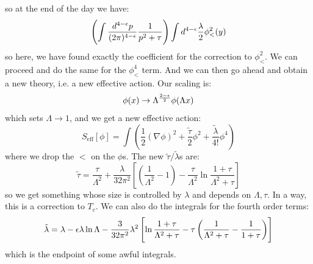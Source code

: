 so at the end of the day we have:
\begin{equation}
    \left(\int \frac{d^{4-\e}p}{(2\pi)^{4-\e}}\frac{1}{p^2 + \tau}\right)\int d^{4-\e}\frac{\lambda}{2}\phi_<^2(y)
\end{equation}
so here, we have found exactly the coefficient for the correction to  $\phi_<^2$. We can proceed and do the same for the $\phi_<^4$ term. And we can then go ahead and obtain a new theory, i.e. a new effective action. Our scaling is:
\begin{equation}
    \phi(x) \to \Lambda^{\frac{2 - \e}{2}}\phi(\Lambda x)
\end{equation}
which sets $\Lambda \to 1$, and we get a new effective action:
\begin{equation}
    S_{\text{eff}}[\phi] = \int\left(\frac{1}{2}(\nabla \phi)^2 + \frac{\tilde{\tau}}{2}\phi^2 + \frac{\tilde{\lambda}}{4!}\phi^4\right)
\end{equation}
where we drop the $<$ on the $\phi$s. The new $\tilde{\tau}/\tilde{\lambda}$s are:
\begin{equation}
    \tilde{\tau} = \frac{\tau}{\Lambda^2} + \frac{\lambda}{32\pi^2}\left[\left(\frac{1}{\Lambda^2} - 1\right) - \frac{\tau}{\Lambda^2}\ln\frac{1 + \tau}{\Lambda^2 + \tau}\right]
\end{equation}
so we get something whose size is controlled by $\lambda$ and depends on $\Lambda, \tau$. In a way, this is a correction to $T_c$. We can also do the integrals for the fourth order terms:
\begin{equation}
    \tilde{\lambda} = \lambda - \epsilon\lambda \ln\Lambda - \frac{3}{32\pi^2}\lambda^2\left[\ln\frac{1+\tau}{\Lambda^2 + \tau} - \tau\left(\frac{1}{\Lambda^2 + \tau} - \frac{1}{1 + \tau}\right)\right]
\end{equation}
which is the endpoint of some awful integrals. 

